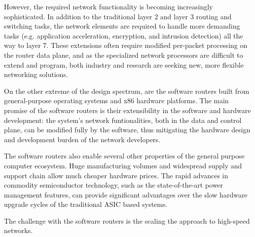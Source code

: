 However, the required network functionality is becoming increasingly sophisticated. In addition to the traditional layer 2 and layer 3 routing and switching tasks, the network elements are required to handle more demanding tasks (e.g. application acceleration, encryption, and intrusion detection) all the way to layer 7. These extensions often require modified per-packet processing on the router data plane, and as the specialized network processors are difficult to extend and program, both industry and research are seeking new, more flexible networking solutions.~\cite{Dobrescu:2009:REP}

On the other extreme of the design spectrum, are the software routers built from general-purpose operating systems and x86 hardware platforms. The main promise of the software routers is their extensibility in the software and hardware development: the system's network funtionalities, both in the data and control plane, can be modified fully by the software, thus mitigating the hardware design and development burden of the network developers.~\cite{Dobrescu:2009:REP}

The software routers also enable several other properties of the general purpose computer ecosystem. Huge manufacturing volumes and widespread supply and support chain allow much cheaper hardware prices. The rapid advances in commodity semiconductor technology, such as the state-of-the-art power management features, can provide significant advantages over the slow hardware upgrade cycles of the traditional ASIC based systems.~\cite{Dobrescu:2009:REP}

The challenge with the software routers is the scaling the approach to high-speed networks.





